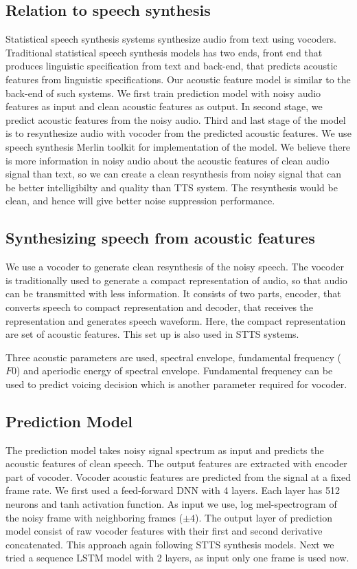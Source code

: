 \documentclass{article}
\begin{document}
\subsection{Relation to speech synthesis}
\label{sub:speech_synth}

Statistical speech synthesis systems synthesize audio from text using vocoders. Traditional statistical speech synthesis models has two ends, front end that produces linguistic specification from text and back-end, that predicts acoustic features from linguistic specifications. Our acoustic feature model is similar to the back-end of such systems. We first train prediction model with noisy audio features as input and clean acoustic features as output. In second stage, we predict acoustic features from the noisy audio.  Third and last stage of the model is to resynthesize audio with vocoder from the predicted acoustic features. We use speech synthesis Merlin toolkit \cite{wu2016merlin} for implementation of the model. We believe there is more information in noisy audio about the acoustic features of clean audio signal than text, so we can create a clean resynthesis from noisy signal that can be better intelligibilty and quality than TTS system. The resynthesis would be clean, and hence will give better noise suppression performance.

\subsection{Synthesizing speech from acoustic features}
\label{sub:voc_feat}
We use a vocoder to generate clean resynthesis of the noisy speech. The vocoder is traditionally used to generate a compact representation of audio, so that audio can be transmitted with less information. It consists of two parts, encoder, that converts speech to compact representation and decoder, that receives the representation and generates speech waveform. Here, the compact representation are set of acoustic features. This set up is also used in STTS systems. 

Three acoustic parameters are used, spectral envelope,  fundamental frequency ($F0$) and aperiodic energy of spectral envelope. Fundamental frequency can be used to predict voicing decision which is another parameter required for vocoder. 

\subsection{Prediction Model}
\label{ssec:model}
The prediction model takes noisy signal spectrum as input and predicts the acoustic features of clean speech. The output features are extracted with encoder part of vocoder. Vocoder acoustic features are predicted from the signal at a fixed frame rate. We first used a feed-forward DNN with 4 layers. Each layer has 512 neurons and tanh activation function. As input we use, log mel-spectrogram of the noisy frame with neighboring frames ($\pm 4$). The output layer of prediction model consist of raw vocoder features with their first and second derivative concatenated. This approach again following STTS synthesis models. Next we tried a sequence LSTM model with 2 layers, as input only one frame is used now.
\end{document}
